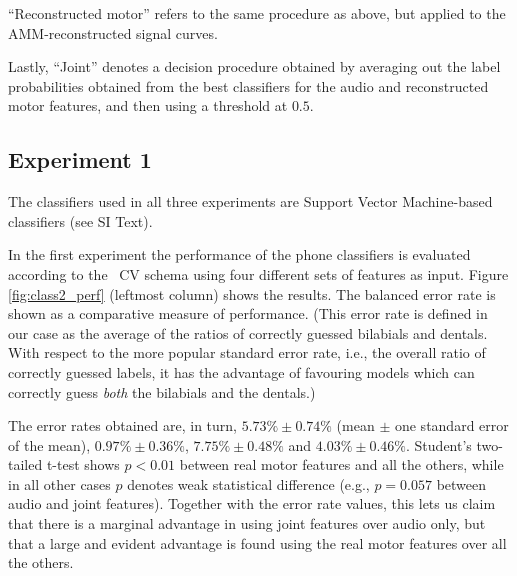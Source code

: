 ``Reconstructed motor'' refers to the same procedure as above, but applied
to the AMM-reconstructed signal curves.

Lastly, ``Joint'' denotes a decision procedure obtained by averaging out the
label probabilities obtained from the best classifiers for the audio and
reconstructed motor features, and then using a threshold at $0.5$.


\subsection{Experiment 1}
\label{subsec:exp1}

The classifiers used in all three experiments are Support Vector Machine-based classifiers 
\cite{BGV92} (see SI Text).

In the first experiment the performance of the phone classifiers is evaluated
according to the \overall\ CV schema using four different sets of features as
input. Figure \ref{fig:class2_perf} (leftmost column) shows the results. The balanced error rate
is shown as a comparative measure of performance. (This error rate is defined in
our case as the average of the ratios of correctly guessed bilabials and dentals.
With respect to the more popular standard error rate, i.e., the overall ratio of correctly
guessed labels, it has the advantage of favouring models which can correctly guess
\emph{both} the bilabials and the dentals.)



The error rates obtained are, in turn,
$5.73\% \pm 0.74\%$ (mean $\pm$ one standard error of the mean),
$0.97\% \pm 0.36\%$,
$7.75\% \pm 0.48\%$ and
$4.03\% \pm 0.46\%$. Student's two-tailed t-test shows $p<0.01$ between real motor features
and all the others, while in all other cases $p$ denotes weak statistical difference (e.g.,
$p=0.057$ between audio and joint features). Together with the error rate values, this lets
us claim that there is a marginal advantage in using joint features
over audio only, but that a large and evident advantage is found using the real motor features
over all the others.

